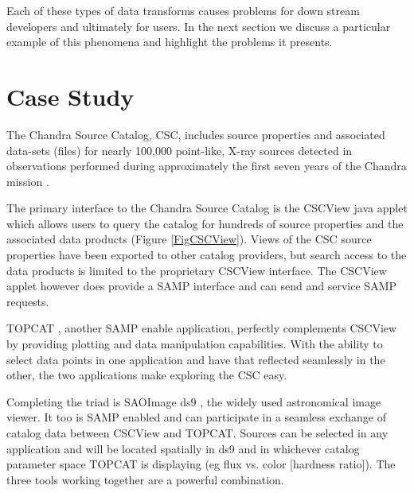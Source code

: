 \documentclass[11pt,twoside]{article}
\begin{document}
Each of these types of data transforms causes problems for down stream
developers and ultimately for users. In the next section we discuss a
particular example of this phenomena and highlight the problems it presents.







\section{Case Study}




The Chandra Source Catalog, CSC,  includes source properties and 
associated data-sets (files) for nearly 100,000 point-like, X-ray sources 
detected in observations performed during approximately the first 
seven years of the Chandra mission \citep{2010ApJS..189...37E}. 


The primary interface to the Chandra Source Catalog is the CSCView java 
applet \citep{2011ASPC..442..649V}
 which allows users to query the 
catalog for hundreds of source properties and the associated
 data products (Figure \ref{FigCSCView}).
Views of the CSC source properties have been 
exported to other catalog providers, but search access to the data 
products is limited to the proprietary CSCView interface.  The CSCView 
applet however does provide a SAMP \citep{2011arXiv1110.0528T} interface and can send and 
service SAMP requests.

TOPCAT \citep{2005ASPC..347...29T}, another SAMP enable application, perfectly complements CSCView 
by providing
plotting and data manipulation capabilities.  With the ability to select
data points in one application and have that reflected seamlessly in the other,
the two applications make exploring the CSC easy.  

Completing the triad is SAOImage ds9 \citep{2003ASPC..295..489J}, the widely used astronomical image viewer. 
It too is SAMP enabled and can participate in a seamless exchange 
of catalog data between CSCView and TOPCAT.  Sources can be selected in any
application and will be located spatially in ds9 and in whichever catalog
parameter space TOPCAT is displaying (eg flux vs. color [hardness ratio]).
The three tools working together are a powerful combination.  
\end{document}
